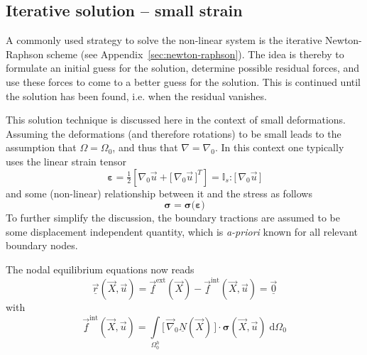 \documentclass[times,namecite]{goose-article}
\begin{document}
\subsection{Iterative solution -- small strain}

A commonly used strategy to solve the non-linear system is the iterative Newton-Raphson scheme (see Appendix~\ref{sec:newton-raphson}). The idea is thereby to formulate an initial guess for the solution, determine possible residual forces, and use these forces to come to a better guess for the solution. This is continued until the solution has been found, i.e. when the residual vanishes.

This solution technique is discussed here in the context of small deformations. Assuming the deformations (and therefore rotations) to be small leads to the assumption that $\Omega = \Omega_0$, and thus that $\nabla = \nabla_0$. In this context one typically uses the linear strain tensor
\begin{equation}
  \bm{\varepsilon}
  =
  \tfrac{1}{2} \left[ \nabla_0 \vec{u} + \big[\, \nabla_0 \vec{u} \,\big]^T \right]
  =
  \mathbb{I}_s : \big[\, \nabla_0 \vec{u} \,\big]
\end{equation}
and some (non-linear) relationship between it and the stress as follows
\begin{equation}
  \bm{\sigma} = \bm{\sigma} \big( \bm{\varepsilon} \big)
\end{equation}
To further simplify the discussion, the boundary tractions are assumed to be some displacement independent quantity, which is \textit{a-priori} known for all relevant boundary nodes.

The nodal equilibrium equations now reads
\begin{equation}
\label{eq:static:eq-non-lin}
  \underline{\vec{r}}(\vec{X}, \vec{u})
  =
  \underline{\vec{f}}^\mathrm{ext}(\vec{X})
  -
  \underline{\vec{f}}^\mathrm{int}(\vec{X}, \vec{u})
  =
  \underline{\vec{0}}
\end{equation}
with
\begin{equation}
  \underline{\vec{f}}^\mathrm{int}(\vec{X}, \vec{u})
  =
  \int\limits_{\Omega^h_0}
    \big[\, \vec{\nabla}_0 \underline{N}(\vec{X}) \,\big]
    \cdot
    \bm{\sigma}(\vec{X}, \vec{u}) \;
  \mathrm{d}\Omega_0
\end{equation}
\end{document}
